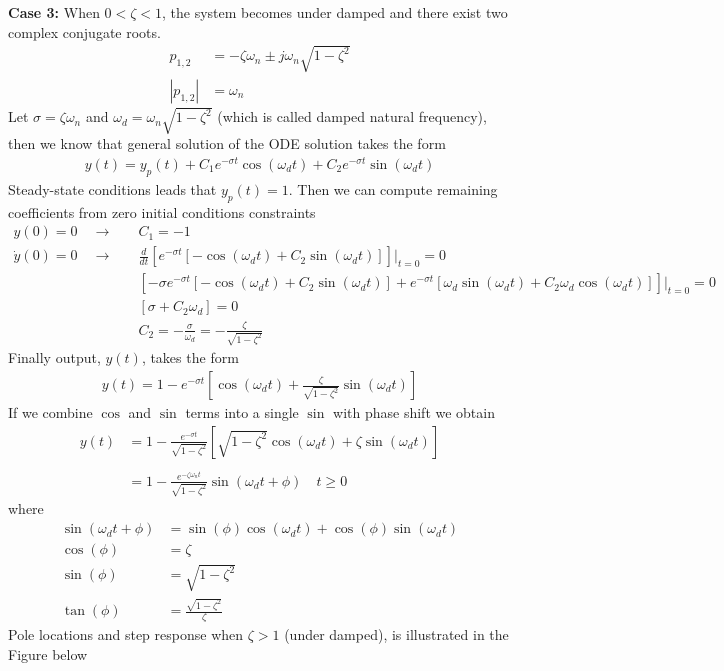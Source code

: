 \documentclass[twoside]{article}
\begin{document}
\textbf{Case 3:} When $0 <  \zeta < 1$, the system becomes under damped and there exist 
  two complex conjugate roots.
 \begin{align*}
 p_{1,2} &= - \zeta \omega_n \pm j \omega_n \sqrt{1 - \zeta^2}
 \\
 | p_{1,2} | &= \omega_n
 \end{align*}
 Let $\sigma = \zeta \omega_n$ and $\omega_d = \omega_n \sqrt{1 - \zeta^2}$ (which is called damped
 natural frequency), then we know that general solution of the ODE solution takes the form
 \begin{align*}
 	y(t) = y_p(t) + C_1 e^{-\sigma t} \cos(\omega_d t) + C_2 e^{-\sigma t} \sin(\omega_d t) 
 \end{align*}
Steady-state conditions leads that $y_p(t) = 1$. Then we can compute remaining coefficients
from zero initial conditions constraints
 \begin{align*}
 y(0) = 0 \quad \rightarrow \quad& C_1 = -1
 \\
 \dot{y}(0) = 0 \quad \rightarrow \quad&
\frac{d}{dt} \left[ e^{-\sigma t} [ -\cos(\omega_d t) + C_2  \sin(\omega_d t) ] \right]|_{t = 0} = 0
\\
& \left[ -\sigma e^{-\sigma t} [ -\cos(\omega_d t) + C_2  \sin(\omega_d t) ] 
+ e^{-\sigma t} [ \omega_d  \sin(\omega_d t) + C_2  \omega_d \cos(\omega_d t) ]  \right] |_{t = 0} = 0
\\
&\left[ \sigma  + C_2  \omega_d  \right] = 0
\\
&C_2 = -\frac{\sigma}{\omega_d} = -\frac{\zeta}{\sqrt{1 - \zeta^2}}
 \end{align*} 
 Finally output, $y(t)$, takes the form
  \begin{align*}
  y(t) = 1 - e^{-\sigma t} \left[ \cos(\omega_d t) + \frac{\zeta}{\sqrt{1 - \zeta^2}} \sin(\omega_d t) \right]
  \end{align*}
%
If we combine $\cos$ and $\sin$  terms into a single $\sin$ with phase shift we obtain
%
  \begin{align*}
    y(t) &= 1 - \frac{e^{-\sigma t}}{ \sqrt{1 - \zeta^2} } \left[ \sqrt{1 - \zeta^2} \cos(\omega_d t) + \zeta \sin(\omega_d t) \right]
    \\
    \\
&= 1 - \frac{e^{- \zeta \omega_n t}}{ \sqrt{1 - \zeta^2} } \sin(\omega_d t + \phi) \quad t \geq 0
  \end{align*}
  where
 \begin{align*}
   \sin(\omega_d t + \phi) &=   \sin( \phi)  \cos(\omega_d t) +   \cos( \phi)   \sin(\omega_d t) 
   \\
   \cos( \phi) &= \zeta 
   \\
   \sin( \phi) &= \sqrt{1 - \zeta^2} 
   \\
   \tan( \phi) &= \frac{\sqrt{1 - \zeta^2} }{\zeta} 
\end{align*}
 Pole locations and step response when $\zeta > 1$ (under damped), is illustrated in
the Figure below
\end{document}
